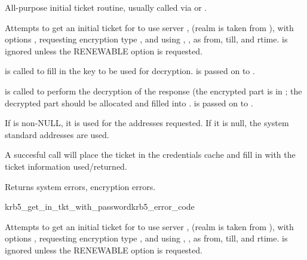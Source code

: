 All-purpose initial ticket routine, usually called via
 or
.

Attempts to get an initial ticket for  to use server
, (realm is taken from
), with options 
, requesting encryption type , and using
,  ,
as from, till, and rtime.   is
ignored unless the RENEWABLE option is requested.

 is called to fill in the key to be used for decryption.
 is passed on to .

 is called to perform the decryption of the
response (the encrypted part is in ; the
decrypted part should be allocated and filled into
.
 is passed on to .

If  is non-NULL, it is used for the addresses
requested.  If it is null, the system standard addresses are used.

A succesful call will place the ticket in the credentials cache
 and fill in  with the ticket
information used/returned.

Returns system errors, encryption errors.

\begin{funcdecl}{krb5_get_in_tkt_with_password}{krb5_error_code}{\funcin}
\funcinout
{}
\end{funcdecl}


Attempts to get an initial ticket for  to use server
, (realm is taken from
), with options 
, requesting encryption type , and using
,
,
as from, till, and rtime.   is
ignored unless the RENEWABLE option is requested.

